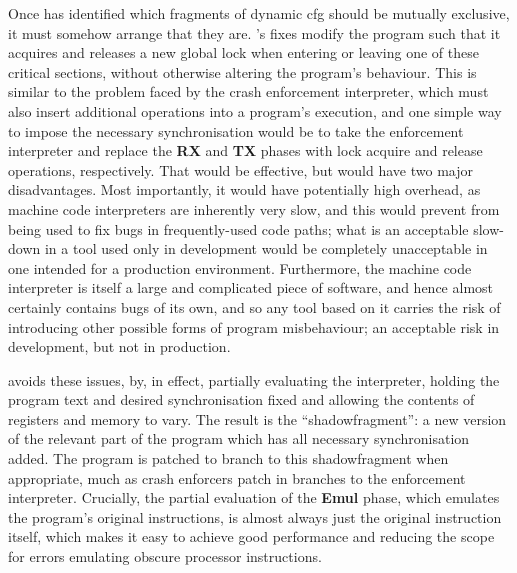 Once {\technique} has identified which fragments of dynamic \gls{cfg}
should be mutually exclusive, it must somehow arrange that they are.
{\Technique}'s fixes modify the program such that it acquires and
releases a new global lock when entering or leaving one of these
critical sections, without otherwise altering the program's behaviour.
This is similar to the problem faced by the crash enforcement
interpreter, which must also insert additional operations into a
program's execution, and one simple way to impose the necessary
synchronisation would be to take the enforcement interpreter and
replace the \textbf{RX} and \textbf{TX} phases with lock acquire and
release operations, respectively.  That would be effective, but would
have two major disadvantages.  Most importantly, it would have
potentially high overhead, as machine code interpreters are inherently
very slow\needCite{}, and this would prevent {\technique} from being
used to fix bugs in frequently-used code paths; what is an acceptable
slow-down in a tool used only in development would be completely
unacceptable in one intended for a production environment.
Furthermore, the machine code interpreter is itself a large and
complicated piece of software, and hence almost certainly contains
bugs of its own, and so any tool based on it carries the risk of
introducing other possible forms of program misbehaviour; an
acceptable risk in development, but not in production.

{\Technique} avoids these issues, by, in effect, partially evaluating
the interpreter, holding the program text and desired synchronisation
fixed and allowing the contents of registers and memory to vary.  The
result is the ``\gls{shadowfragment}'': a new version of the relevant
part of the program which has all necessary synchronisation added.
The program is patched to branch to this \gls{shadowfragment} when
appropriate, much as crash enforcers patch in branches to the
enforcement interpreter.  Crucially, the partial evaluation of the
\textbf{Emul} phase, which emulates the program's original
instructions, is almost always just the original instruction itself,
which makes it easy to achieve good performance and reducing the scope
for errors emulating obscure processor instructions.

